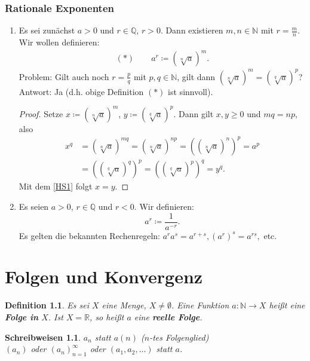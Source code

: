 \documentclass[12pt]{extreport} %
\newcommand{\N}{\mathbb{N}}
\newcommand{\Q}{\mathbb{Q}}
\newcommand{\R}{\mathbb{R}}
\theoremstyle{named}
\theoremstyle{itshape}
\newtheorem*{definition}{Definition}
\theoremstyle{normal}
\newtheorem*{schreibweisen}{Schreibweisen}
\begin{document}
\subsection*{Rationale Exponenten}
\begin{enumerate}
	\item Es sei zunächst $a > 0$ und $r \in \Q$, $r > 0$. Dann existieren $m, n \in \N$ mit $r = \frac{m}{n}$. Wir wollen definieren:
		\begin{align*}
		(\ast) \quad \quad a^{r} \coloneqq \left( \sqrt[n]{a} \right)^{m}. 			
		\end{align*}
		Problem: Gilt auch noch $r = \frac{p}{q}$ mit $p, q \in \N$, gilt dann $\left( \sqrt[n]{a} \right)^{m} = \left( \sqrt[q]{a} \right)^{p}$? \\
		Antwort: Ja (d.h. obige Definition $(*)$ ist sinnvoll).
		\begin{proof}
			Setze $x \coloneqq \left( \sqrt[n]{a} \right)^{m}$, $y \coloneqq \left( \sqrt[q]{a} \right)^{p}$. Dann gilt $x, y \geq 0$ und $mq = np$, also
			\begin{align*}
				x^{q} & = \left( \sqrt[n]{a} \right)^{mq} = \left( \sqrt[n]{a} \right)^{np} = \left(  \left( \sqrt[n]{a} \right)^{n}\right)^{p} = a^{p} \\
					  & = \left( \left( \sqrt[q]{a} \right)^{q}\right)^{p} = \left( \left( \sqrt[q]{a} \right)^{p}\right)^{q} = y^{q}.
			\end{align*}
			Mit dem \ref{HS1} folgt $x = y$.  
		\end{proof}
	\item Es seien $a > 0$, $r \in \Q$ und $r < 0$. Wir definieren: $$a^{r} \coloneqq \frac{1}{a^{-r}}.$$
	          Es gelten die bekannten Rechenregeln: $a^{r} a^{s} = a^{r + s}, \left( a^{r} \right)^{s} = a^{rs}, $ etc.
\end{enumerate}


\newpage


\chapter{Folgen und Konvergenz}

\begin{definition}
	Es sei $X$ eine Menge, $X \neq \emptyset$. Eine Funktion $a \colon \N \to X$ hei{\ss}t eine \textbf{Folge in} $X$. Ist $X = \R$, so hei{\ss}t $a$ eine 
	\textbf{reelle Folge}.
\end{definition}


\begin{schreibweisen}
$a_{n}$ statt $a(n)$ ($n$-tes Folgenglied) \\
$(a_{n})$ oder $(a_{n})_{n = 1}^{\infty}$ oder $(a_{1}, a_{2}, \dotsc)$ statt $a$.
\end{schreibweisen}
\end{document}
